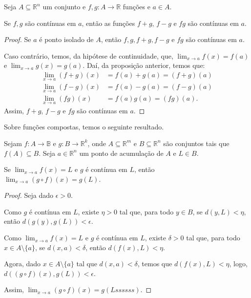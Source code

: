 \begin{corollary}
    Seja $A\subseteq \mathbb R^n$ um conjunto e $f, g: A \to \mathbb R$ funções e $a \in A$.

    Se $f, g$ são contínuas em $a$, então as funções $f+g$, $f-g$ e $fg$ são contínuas em $a$.
\end{corollary}

\begin{proof}
    Se $a$ é ponto isolado de $A$, então $f, g, f+g, f-g$ e $fg$ são contínuas em $a$.

    Caso contrário, temos, da hipótese de continuidade, que, $\lim_{x\to a} f(x) = f(a)$ e $\lim_{x\to a} g(x) = g(a)$.
    Daí, da proposição anterior, temos que:
    \begin{align*}
        \lim_{x\to a} (f+g)(x) &= f(a) + g(a) = (f+g)(a) \\
        \lim_{x\to a} (f-g)(x) &= f(a) - g(a) = (f-g)(a) \\
        \lim_{x\to a} (fg)(x) &= f(a)g(a) = (fg)(a).
    \end{align*}
    Assim, $f+g$, $f-g$ e $fg$ são contínuas em $a$.
\end{proof}

Sobre funções compostas, temos o seguinte resultado.
\begin{proposition}
    Sejam $f: A \to \mathbb B$ e $g: B \to \mathbb R^k$, onde $A\subseteq \mathbb R^m$ e $B\subseteq \mathbb R^n$ são conjuntos tais que $f(A)\subseteq B$.
    Seja $a \in \mathbb R^n$ um ponto de acumulação de $A$ e $L \in B$.

    Se $\lim_{x\to a} f(x) = L$ e $g$ é contínua em $L$, então $\lim_{x\to a} (g\circ f)(x) = g(L)$.
\end{proposition}

\begin{proof}
    Seja dado $\epsilon>0$.

    Como $g$ é contínua em $L$, existe $\eta>0$ tal que, para todo $y \in B$, se $d(y, L) < \eta$, então $d(g(y), g(L)) < \epsilon$.

    Como $\lim_{x\to a} f(x) = L$ e $g$ é contínua em $L$, existe $\delta>0$ tal que, para todo $x \in A\setminus\{a\}$, se $d(x, a) < \delta$, então $d(f(x), L) < \eta$.


    Agora, dado $x \in A\setminus\{a\}$ tal que $d(x, a) < \delta$, temos que $d(f(x), L) < \eta$, logo, $d((g\circ f)(x), g(L)) < \epsilon$.

    Assim, $\lim_{x\to a} (g\circ f)(x) = g(Lssssss)$.
\end{proof}

